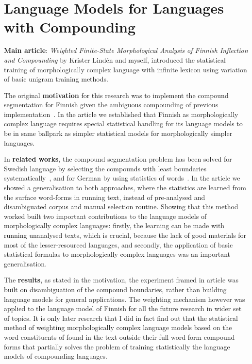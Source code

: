 \documentclass[officiallayout]{unihelcompling}
\begin{document}
\section{Language Models for Languages with Compounding}
\label{sec:compounding}

\textbf{Main article}: \emph{Weighted Finite-State Morphological Analysis of
Finnish Inflection and Compounding}  by Krister
Lindén and myself, introduced the statistical training of morphologically
complex language with infinite lexicon using variation of basic unigram
training methods.

The original \textbf{motivation} for this research was to implement the
compound segmentation for Finnish given the ambiguous compounding of previous
implementation~\citep{pirinen2008suomen}. In the article we established that
Finnish as morphologically complex language requires special statistical
handling for its language models to be in same ballpark as simpler statistical
models for morphologically simpler languages.

In \textbf{related works}, the compound segmentation problem has been solved
for Swedish language by selecting the compounds with least boundaries
systematically~\citep{karlsson1992swetwol}, and for German by using statistics
of words~\citep{schiller2006german}. In the article we showed a generalisation
to both approaches, where the statistics are learned from the surface
word-forms in running text, instead of pre-analysed and disambiguated corpus
and manual selection routine.  Showing that this method worked built two
important contributions to the language models of morphologically complex
languages: firstly, the learning can be made with running unanalysed texts,
which is crucial, because the lack of good materials for most of the
lesser-resourced languages, and secondly, the application of basic statistical
formulas to morphologically complex languages was an important generalisation.

The \textbf{results}, as stated in the motivation, the experiment framed in
article was built on disambiguation of the compound boundaries, rather than
building language models for general applications. The weighting mechanism
however was applied to the language model of Finnish for all the future
research in wider set of topics. It is only later research that I did in fact
find out that the statistical method of weighting morphologically complex
language models based on the word constituents of found in the text outside
their full word form compound forms that partially solves the problem of
training statistically the language models of compounding languages.
\end{document}
